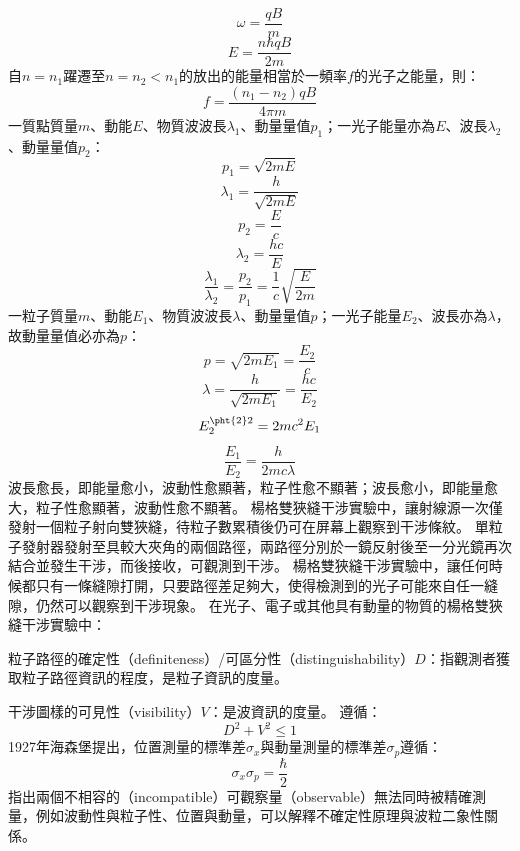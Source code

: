 \documentclass[a4paper,12pt]{article}
\begin{document}
\[\omega=\frac{qB}{m}\]
\[E=\frac{n\hbar qB}{2m}\]
自$n=n_1$躍遷至$n=n_2<n_1$的放出的能量相當於一頻率$f$的光子之能量，則：
\[f=\frac{(n_1-n_2)qB}{4\pi m}\]
一質點質量$m$、動能$E$、物質波波長$\lambda_1$、動量量值$p_1$；一光子能量亦為$E$、波長$\lambda_2$、動量量值$p_2$：
\[p_1=\sqrt{2mE}\]
\[\lambda_1=\frac{h}{\sqrt{2mE}}\]
\[p_2=\frac{E}{c}\]
\[\lambda_2=\frac{hc}{E}\]
\[\frac{\lambda_1}{\lambda_2}=\frac{p_2}{p_1}=\frac{1}{c}\sqrt{\frac{E}{2m}}\]
一粒子質量$m$、動能$E_1$、物質波波長$\lambda$、動量量值$p$；一光子能量$E_2$、波長亦為$\lambda$，故動量量值必亦為$p$：
\[p=\sqrt{2mE_1}=\frac{E_2}{c}\]
\[\lambda=\frac{h}{\sqrt{2mE_1}}=\frac{hc}{E_2}\]
\[E_2^{\pht{2}2}=2mc^2E_1\]
\[\frac{E_1}{E_2}=\frac{h}{2mc\lambda}\]
波長愈長，即能量愈小，波動性愈顯著，粒子性愈不顯著；波長愈小，即能量愈大，粒子性愈顯著，波動性愈不顯著。
楊格雙狹縫干涉實驗中，讓射線源一次僅發射一個粒子射向雙狹縫，待粒子數累積後仍可在屏幕上觀察到干涉條紋。
單粒子發射器發射至具較大夾角的兩個路徑，兩路徑分別於一鏡反射後至一分光鏡再次結合並發生干涉，而後接收，可觀測到干涉。
楊格雙狹縫干涉實驗中，讓任何時候都只有一條縫隙打開，只要路徑差足夠大，使得檢測到的光子可能來自任一縫隙，仍然可以觀察到干涉現象。
在光子、電子或其他具有動量的物質的楊格雙狹縫干涉實驗中：
\bit
\item 粒子路徑的確定性（definiteness）/可區分性（distinguishability）$D$：指觀測者獲取粒子路徑資訊的程度，是粒子資訊的度量。
\item 干涉圖樣的可見性（visibility）$V$：是波資訊的度量。
\eit
遵循：
\[D^2+V^2\leq 1\]
1927年海森堡提出，位置測量的標準差$\sigma_x$與動量測量的標準差$\sigma_p$遵循：
\[\sigma_x\sigma_p=\frac{\hbar}{2}\]
指出兩個不相容的（incompatible）可觀察量（observable）無法同時被精確測量，例如波動性與粒子性、位置與動量，可以解釋不確定性原理與波粒二象性關係。
\end{document}
